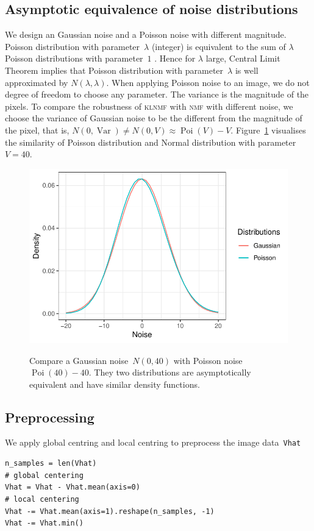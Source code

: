 \subsection{Asymptotic equivalence of noise distributions}
 We design an Gaussian noise and a Poisson noise with different magnitude.
 Poisson distribution with parameter~$\lambda$ (integer) is equivalent to the sum of $\lambda$ Poisson distributions with parameter~$1$ \citep[][p. 45]{Walck:1996cca}.
 Hence for $\lambda$ large, Central Limit Theorem implies that Poisson distribution with parameter~$\lambda$ is well approximated by $N(\lambda,\lambda)$.
 When applying Poisson noise to an image, we do not degree of freedom to choose any parameter.
 The variance is the magnitude of the pixels. To compare the robustness of \textsc{klnmf} with \textsc{nmf} with different noise, we choose the variance of Gaussian noise to be the different from the magnitude of the pixel, that is, $N(0,\operatorname{Var})\neq N(0,V)\approx \operatorname{Poi}(V)-V$.
 Figure~\ref{noise} visualises the similarity of Poisson distribution and Normal distribution with parameter~$V=40$.
\begin{figure}
  \centering
  \includegraphics[scale=1]{resource/noise}\\
  \caption{Compare a Gaussian noise~$N(0,40)$ with Poisson noise $\operatorname{Poi}(40)-40$. They two distributions are asymptotically equivalent and have similar density functions.}\label{noise}
\end{figure}
\subsection{Preprocessing}
We apply global centring and local centring to preprocess the image data~\texttt{Vhat}
\begin{lstlisting}[caption=Centring image data, label=matn1]
n_samples = len(Vhat)
# global centering
Vhat = Vhat - Vhat.mean(axis=0)
# local centering
Vhat -= Vhat.mean(axis=1).reshape(n_samples, -1)
Vhat -= Vhat.min()
\end{lstlisting}
